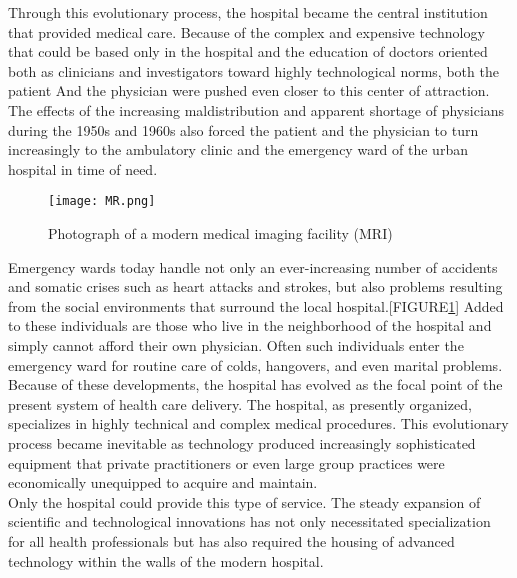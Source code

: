 \documentclass[12pt]{article}
\begin{document}
Through this evolutionary process, the hospital became the central institution that provided medical care.
Because of the complex and expensive technology that could be based only in the hospital and the education of doctors oriented both as clinicians and investigators toward highly technological norms, both the patient And the physician were pushed even closer to this center of attraction.
The effects of the increasing maldistribution and apparent shortage of physicians during the 1950s and 1960s also forced the patient and the physician to turn increasingly to the ambulatory clinic and the emergency ward of the urban hospital in time of need.
\begin{figure}[h]
\centering
\texttt{[image: MR.png]}
\caption{Photograph of a modern medical imaging facility (MRI)
}
\label{fig_MR}
\end{figure}
Emergency wards today handle not only an ever-increasing number of accidents and somatic crises such as heart attacks and strokes, but also problems resulting from the social environments that surround the local hospital.[FIGURE\ref{fig_MR}]
Added to these individuals are those who live in the neighborhood of the hospital and simply cannot afford their own physician.
Often such individuals enter the emergency ward for routine care of colds, hangovers, and even marital problems.
Because of these developments, the hospital has evolved as the focal point of the present system of health care delivery.
The hospital, as presently organized, specializes in highly technical and complex medical procedures.
This evolutionary process became inevitable as technology produced increasingly sophisticated equipment that private practitioners or even large group practices were economically unequipped to acquire and maintain.\\

Only the hospital could provide this type of service.
The steady expansion of scientific and technological innovations has not only necessitated specialization for all health professionals but has also required the housing of advanced technology within the walls of the modern hospital.
\end{document}
